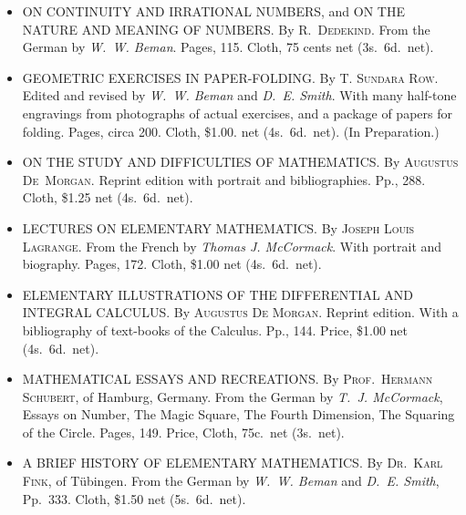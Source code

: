 \documentclass[oneside]{book}
\begin{document}
\smallskip
\begin{small}
\begin{itemize}
\item[]\hspace{-2em}ON CONTINUITY AND IRRATIONAL NUMBERS, and
ON THE NATURE AND MEANING OF NUMBERS\@.
By \textsc{R.~Dedekind}. From the German by \textit{W.~W. Beman}.
Pages, 115. Cloth, 75 cents net (3s.\ 6d.\ net).

\item[]\hspace{-2em}GEOMETRIC EXERCISES IN PAPER-FOLDING\@. By \textsc{T.
Sundara Row}. Edited and revised by \textit{W.~W. Beman} and
\textit{D.~E. Smith}. With many half-tone engravings from photographs
of actual exercises, and a package of papers for
folding. Pages, circa 200. Cloth, \$1.00. net (4s.\ 6d.\ net).
(In Preparation.)

\item[]\hspace{-2em}ON THE STUDY AND DIFFICULTIES OF MATHEMATICS\@.
By \textsc{Augustus De~Morgan}. Reprint edition
with portrait and bibliographies. Pp., 288. Cloth, \$1.25
net (4s.\ 6d.\ net).

\item[]\hspace{-2em}LECTURES ON ELEMENTARY MATHEMATICS\@. By
\textsc{Joseph Louis Lagrange}. From the French by \textit{Thomas J.
McCormack}. With portrait and biography. Pages, 172.
Cloth, \$1.00 net (4s.\ 6d.\ net).

\item[]\hspace{-2em}ELEMENTARY ILLUSTRATIONS OF THE DIFFERENTIAL
AND INTEGRAL CALCULUS\@. By \textsc{Augustus De
Morgan}. Reprint edition. With a bibliography of text-books
of the Calculus. Pp., 144. Price, \$1.00 net (4s.\ 6d.\ net).

\item[]\hspace{-2em}MATHEMATICAL ESSAYS AND RECREATIONS\@. By
\textsc{Prof.\ Hermann Schubert}, of Hamburg, Germany. From
the German by \textit{T.~J. McCormack}, Essays on Number,
The Magic Square, The Fourth Dimension, The Squaring
of the Circle. Pages, 149. Price, Cloth, 75c.\ net (3s.\ net).

\item[]\hspace{-2em}A BRIEF HISTORY OF ELEMENTARY MATHEMATICS\@.
By \textsc{Dr.\ Karl Fink}, of Tübingen. From the German by \textit{W.~W.
Beman} and \textit{D.~E. Smith}, Pp.~333. Cloth, \$1.50 net
(5s.\ 6d.\ net).

\end{itemize}
\end{small}
\end{document}
